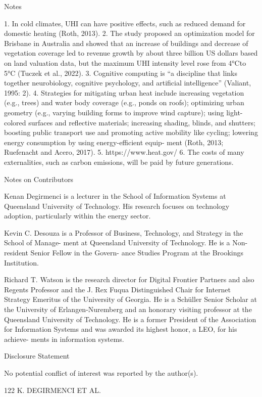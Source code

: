 \documentclass[10pt,a4paper]{article}
\begin{document}
Notes

1. In cold climates, UHI can have positive eﬀects, such as reduced demand for domestic heating (Roth, 2013). 2. The study proposed an optimization model for Brisbane in Australia and showed that an increase of buildings and decrease of vegetation coverage led to revenue growth by about three billion US dollars based on land valuation data, but the maximum UHI intensity level rose from 4°Cto 5°C (Tuczek et al., 2022). 3. Cognitive computing is “a discipline that links together neurobiology, cognitive psychology, and artiﬁcial intelligence” (Valiant, 1995: 2). 4. Strategies for mitigating urban heat include increasing vegetation (e.g., trees) and water body coverage (e.g., ponds on roofs); optimizing urban geometry (e.g., varying building forms to improve wind capture); using light-colored surfaces and reﬂective materials; increasing shading, blinds, and shutters; boosting public transport use and promoting active mobility like cycling; lowering energy consumption by using energy-eﬃcient equip- ment (Roth, 2013; Ruefenacht and Acero, 2017). 5. https://www.heat.gov/ 6. The costs of many externalities, such as carbon emissions, will be paid by future generations.

Notes on Contributors

Kenan Degirmenci is a lecturer in the School of Information Systems at Queensland University of Technology. His research focuses on technology adoption, particularly within the energy sector.

Kevin C. Desouza is a Professor of Business, Technology, and Strategy in the School of Manage- ment at Queensland University of Technology. He is a Non-resident Senior Fellow in the Govern- ance Studies Program at the Brookings Institution.

Richard T. Watson is the research director for Digital Frontier Partners and also Regents Professor and the J. Rex Fuqua Distinguished Chair for Internet Strategy Emeritus of the University of Georgia. He is a Schüller Senior Scholar at the University of Erlangen-Nuremberg and an honorary visiting professor at the Queensland University of Technology. He is a former President of the Association for Information Systems and was awarded its highest honor, a LEO, for his achieve- ments in information systems.

Disclosure Statement

No potential conﬂict of interest was reported by the author(s).

122 K. DEGIRMENCI ET AL.
\end{document}
